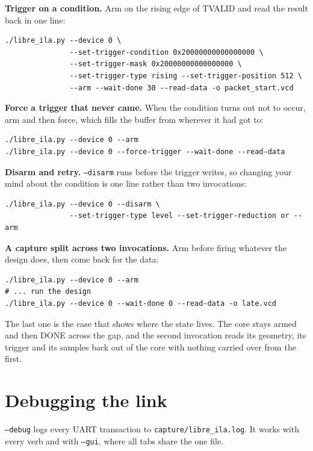 \documentclass[../manual.tex]{subfiles}
\begin{document}
\textbf{Trigger on a condition.} Arm on the rising edge of TVALID and read the result back in one line:

\begin{lstlisting}
./libre_ila.py --device 0 \
               --set-trigger-condition 0x20000000000000000 \
               --set-trigger-mask 0x20000000000000000 \
               --set-trigger-type rising --set-trigger-position 512 \
               --arm --wait-done 30 --read-data -o packet_start.vcd
\end{lstlisting}

\textbf{Force a trigger that never came.} When the condition turns out not to occur, arm and then force, which fills the buffer from wherever it had got to:

\begin{lstlisting}
./libre_ila.py --device 0 --arm
./libre_ila.py --device 0 --force-trigger --wait-done --read-data
\end{lstlisting}

\textbf{Disarm and retry.} \texttt{--disarm} runs before the trigger writes, so changing your mind about the condition is one line rather than two invocations:

\begin{lstlisting}
./libre_ila.py --device 0 --disarm \
               --set-trigger-type level --set-trigger-reduction or --arm
\end{lstlisting}

\textbf{A capture split across two invocations.} Arm before firing whatever the design does, then come back for the data:

\begin{lstlisting}
./libre_ila.py --device 0 --arm
# ... run the design
./libre_ila.py --device 0 --wait-done 0 --read-data -o late.vcd
\end{lstlisting}

The last one is the case that shows where the state lives. The core stays armed and then DONE across the gap, and the second invocation reads its geometry, its trigger and its samples back out of the core with nothing carried over from the first.

\section{Debugging the link}
\label{sec:cli_debug}

\texttt{--debug} logs every UART transaction to \texttt{capture/libre\_ila.log}. It works with every verb and with \texttt{--gui}, where all tabs share the one file.
\end{document}
